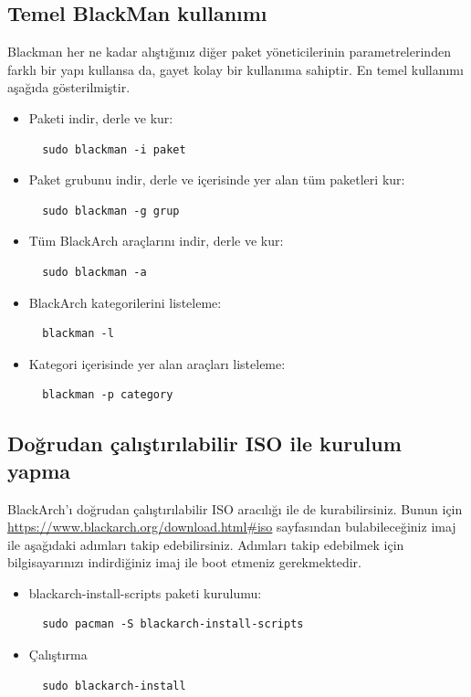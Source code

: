 \documentclass[a4paper, oneside, 11pt]{book}
\begin{document}
\subsection{Temel BlackMan kullanımı}
Blackman her ne kadar alıştığınız diğer paket yöneticilerinin parametrelerinden farklı bir yapı kullansa da, gayet kolay bir kullanıma sahiptir. En temel kullanımı aşağıda gösterilmiştir.

\begin{itemize}
\item Paketi indir, derle ve kur:
\begin{lstlisting}
  sudo blackman -i paket
\end{lstlisting}

\item Paket grubunu indir, derle ve içerisinde yer alan tüm paketleri kur:
\begin{lstlisting}
  sudo blackman -g grup
\end{lstlisting}

\item Tüm BlackArch araçlarını indir, derle ve kur:
\begin{lstlisting}
  sudo blackman -a
\end{lstlisting}

\item BlackArch kategorilerini listeleme:
\begin{lstlisting}
  blackman -l
\end{lstlisting}

\item Kategori içerisinde yer alan araçları listeleme:
\begin{lstlisting}
  blackman -p category
\end{lstlisting}

\end{itemize}

\subsection{Doğrudan çalıştırılabilir ISO ile kurulum yapma}
BlackArch'ı doğrudan çalıştırılabilir ISO aracılığı ile de kurabilirsiniz. Bunun için \url{https://www.blackarch.org/download.html#iso} sayfasından bulabileceğiniz imaj ile aşağıdaki adımları takip edebilirsiniz. Adımları takip edebilmek için bilgisayarınızı indirdiğiniz imaj ile boot etmeniz gerekmektedir.

\begin{itemize}
\item blackarch-install-scripts paketi kurulumu:
\begin{lstlisting}
  sudo pacman -S blackarch-install-scripts
\end{lstlisting}

\item Çalıştırma
\begin{lstlisting}
  sudo blackarch-install
\end{lstlisting}

\end{itemize}
\end{document}
